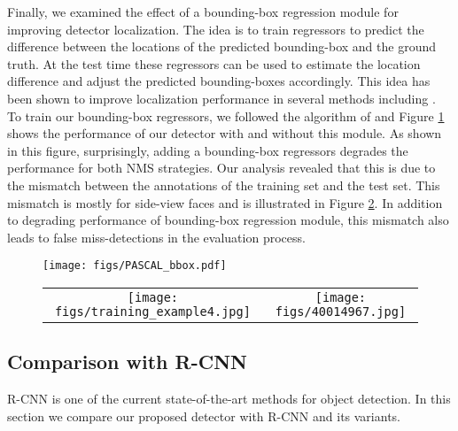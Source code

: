 \documentclass{sig-alternate-2013}
\begin{document}
Finally, we examined the effect of a bounding-box regression module for improving detector localization. The idea is to train regressors to predict the difference between the locations of the predicted bounding-box and the ground truth. At the test time these regressors can be used to estimate the location difference and adjust the predicted bounding-boxes accordingly. This idea has been shown to improve localization performance in several methods including \cite{dpm, overfeat, multi_box}. To train our bounding-box regressors, we followed the algorithm of \cite{rcnn} and Figure \ref{fig:f_bbx_reg_effect} shows the performance of our detector with and without this module. As shown in this figure, surprisingly, adding a bounding-box regressors degrades the performance for both NMS strategies. Our analysis revealed that this is due to the mismatch between the annotations of the training set and the test set. This mismatch is mostly for side-view faces and is illustrated in Figure \ref{fig:train_test_mismatch}. In addition to degrading performance of bounding-box regression module, this mismatch also leads to false miss-detections in the evaluation process.

\begin{figure}[t]
  \centering
    \texttt{[image: figs/PASCAL\_bbox.pdf]}
  \caption{}
  \label{fig:f_bbx_reg_effect}
\end{figure}

\begin{figure}[t]
  \centering
  	\begin{tabular}{cc}
    	\texttt{[image: figs/training\_example4.jpg]} &
    	\texttt{[image: figs/40014967.jpg]} 
    \end{tabular}
  \caption{}
  \label{fig:train_test_mismatch}
\end{figure}


\subsection{Comparison with R-CNN} 

R-CNN \cite{rcnn} is one of the current state-of-the-art methods for object detection. In this section we compare our proposed detector with R-CNN and its variants.
\end{document}
